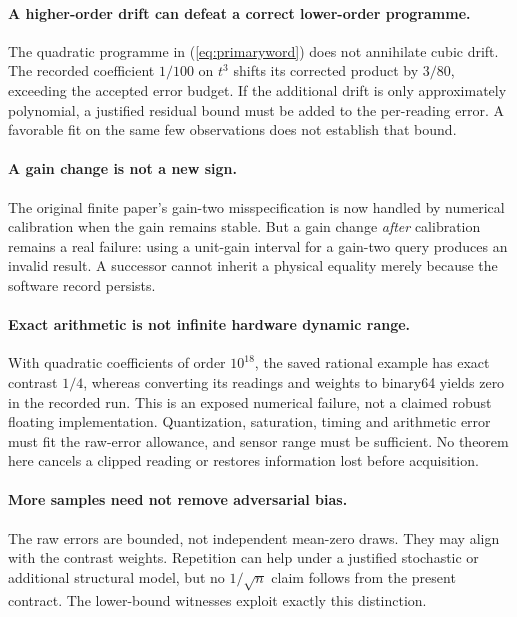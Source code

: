 \documentclass[11pt,letterpaper]{article}
\theoremstyle{definition}\newtheorem{definition}[theorem]{Definition}
\theoremstyle{remark}\newtheorem{remark}[theorem]{Remark}
\begin{document}
\paragraph{A higher-order drift can defeat a correct lower-order programme.}
The quadratic programme in (\ref{eq:primaryword}) does not annihilate cubic drift. The recorded coefficient $1/100$ on $t^3$ shifts its corrected product by $3/80$, exceeding the accepted error budget. If the additional drift is only approximately polynomial, a justified residual bound must be added to the per-reading error. A favorable fit on the same few observations does not establish that bound.

\paragraph{A gain change is not a new sign.}
The original finite paper's gain-two misspecification is now handled by numerical calibration when the gain remains stable. But a gain change \emph{after} calibration remains a real failure: using a unit-gain interval for a gain-two query produces an invalid result. A successor cannot inherit a physical equality merely because the software record persists.

\paragraph{Exact arithmetic is not infinite hardware dynamic range.}
With quadratic coefficients of order $10^{18}$, the saved rational example has exact contrast $1/4$, whereas converting its readings and weights to binary64 yields zero in the recorded run. This is an exposed numerical failure, not a claimed robust floating implementation. Quantization, saturation, timing and arithmetic error must fit the raw-error allowance, and sensor range must be sufficient. No theorem here cancels a clipped reading or restores information lost before acquisition.

\paragraph{More samples need not remove adversarial bias.}
The raw errors are bounded, not independent mean-zero draws. They may align with the contrast weights. Repetition can help under a justified stochastic or additional structural model, but no $1/\sqrt n$ claim follows from the present contract. The lower-bound witnesses exploit exactly this distinction.
\end{document}

